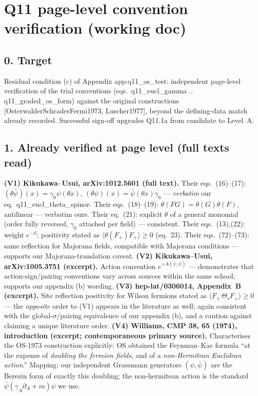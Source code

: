 \section*{Q11 page-level convention verification (working doc)}

\subsection*{0. Target}
Residual condition (c) of Appendix app:q11\_os\_test:
independent page-level verification of the trial conventions
(eqs.~q11\_eucl\_gamma .. q11\_graded\_os\_form) against the original
constructions [OsterwalderSchraderFermi1973, Luscher1977], beyond
the defining-data match already recorded.
Successful sign-off upgrades Q11.1a from candidate to Level~A.

\subsection*{1. Already verified at page level (full texts read)}
\textbf{(V1) Kikukawa--Usui, arXiv:1012.5601 (full text).}
Their eqs.~(16)--(17):
$(\theta\bar\psi)(x)=\gamma_0\psi(\theta x)$,
$(\theta\psi)(x)=\bar\psi(\theta x)\gamma_0$ ---
\emph{verbatim} our eq.~q11\_eucl\_theta\_spinor.
Their eqs.~(18)--(19): $\theta(FG)=\theta(G)\theta(F)$, antilinear
--- verbatim ours.
Their eq.~(21): explicit $\theta$ of a general monomial (order
fully reversed, $\gamma_0$ attached per field) --- consistent.
Their eqs.~(13),(22): weight $e^{-S}$; positivity stated as
$\langle\theta(F_+)F_+\rangle\ge0$ (eq.~23).
Their eqs.~(72)--(73): same reflection for Majorana fields,
compatible with Majorana conditions --- supports our
Majorana-translation caveat.
\textbf{(V2) Kikukawa--Usui, arXiv:1005.3751 (excerpt).}
Action convention $e^{+A(\bar\psi,\psi)}$ --- demonstrates that
action-sign/pairing conventions vary across sources within the same
school; supports our appendix (b) wording.
\textbf{(V3) hep-lat/0306014, Appendix~B (excerpt).}
Site reflection positivity for Wilson fermions stated as
$\langle F_+\,\Theta_s F_+\rangle\ge0$ --- the \emph{opposite}
order to (V1) appears in the literature as well; again consistent
with the global-$\sigma$/pairing equivalence of our appendix (b),
and a caution against claiming a unique literature order.
\textbf{(V4) Williams, CMP 38, 65 (1974), introduction (excerpt;
contemporaneous primary source).}
Characterises the OS-1973 construction explicitly: OS obtained the
Feynman--Kac formula ``at the expense of \emph{doubling the fermion
fields}, and of a \emph{non-Hermitean Euclidean action}.''
Mapping: our independent Grassmann generators $(\psi,\bar\psi)$ are
the Berezin form of exactly this doubling; the non-hermitean action
is the standard $\bar\psi(\gamma_A\partial_A+m)\psi$ we use.

